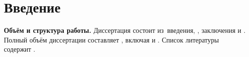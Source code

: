 \chapter*{Введение}                         %

\newcommand{\actuality}{}
\newcommand{\progress}{}
\newcommand{\aim}{{\textbf\aimTXT}}
\newcommand{\tasks}{\textbf{\tasksTXT}}
\newcommand{\novelty}{\textbf{\noveltyTXT}}
\newcommand{\influence}{\textbf{\influenceTXT}}
\newcommand{\methods}{\textbf{\methodsTXT}}
\newcommand{\defpositions}{\textbf{\defpositionsTXT}}
\newcommand{\reliability}{\textbf{\reliabilityTXT}}
\newcommand{\probation}{\textbf{\probationTXT}}
\newcommand{\contribution}{\textbf{\contributionTXT}}
\newcommand{\publications}{\textbf{\publicationsTXT}}


\textbf{Объём и структура работы.} Диссертация состоит из~введения,
,
заключения и
.
%
Полный объём диссертации составляет
, включая
 и
.
Список литературы содержит
.
